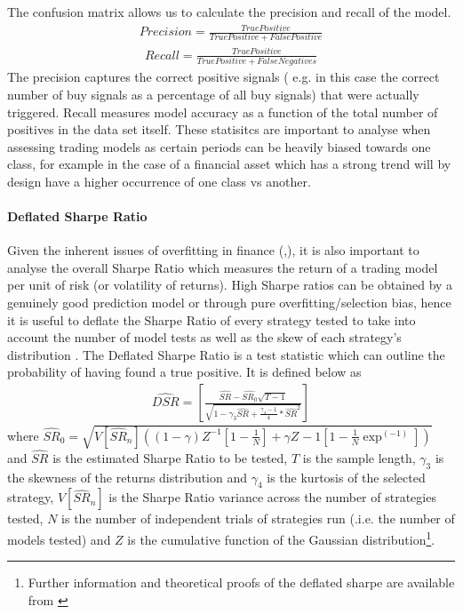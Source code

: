 \documentclass[11pt]{article}
\begin{document}
The confusion matrix allows us to calculate the precision and recall of the model.
\begin{align}
Precision = \frac{True Positive}{True Positive + False Positive} 
\end{align}
\begin{align}
Recall = \frac{True Positive}{True Positive + False Negatives} 
\end{align}
The precision captures the correct positive signals ( e.g. in this case the correct number of buy signals as a percentage of all buy signals) that were actually triggered. Recall measures model accuracy as a function of the total number of positives in the data set itself. These statisitcs are important to analyse when assessing trading models as certain periods can be heavily biased towards one class, for example in the case of a financial asset which has a strong trend will by design have a higher occurrence of one class vs another.

\paragraph{Deflated Sharpe Ratio}
Given the inherent issues of overfitting in finance (\cite{Arnott2018},\cite{LopezdePrado2018}), it is also important to analyse the overall Sharpe Ratio \cite{Sharpe2009} which measures the return of a trading model per unit of risk (or volatility of returns). \newline High Sharpe ratios can be obtained by a genuinely good prediction model or through pure overfitting/selection bias, hence it is useful to deflate the Sharpe Ratio of every strategy tested to take into account the number of model tests as well as the skew of each strategy's distribution \cite{Bailey2014}. 
The Deflated Sharpe Ratio is a test statistic which can outline the probability of having found a true positive. It is defined below as
\begin{align}
\widehat{DSR} = \left[
		 				\frac{\widehat{SR}-\widehat{SR_{0}}\sqrt{T-1}}
						{\sqrt{1-\gamma_{3}\widehat{SR} + \frac{\gamma_{4} - 1}{4}*\widehat{SR}^{2}}} 
				 \right]
\end{align}
where $\widehat{SR}_{0} = \sqrt{V\left[\widehat{SR}_{n}\right] 
						\left(      	
							\left(1- \gamma\right) Z^{-1} \left[ 1- \frac{1}{N}\right] + \gamma Z^{}-1 \left[ 1-\frac{1}{N}\exp^(-1) \right] 
						 \right)}$
and $\widehat{SR}$ is the estimated Sharpe Ratio to be tested, $T$ is the sample length, $\gamma_{3}$ is the skewness of the returns distribution and $\gamma_{4}$ is the kurtosis of the selected strategy,  $V\left[\widehat{SR}_{n}\right]$ is the Sharpe Ratio variance across the number of strategies tested, $N$ is the number of independent trials of strategies run (.i.e. the number of models tested) and $Z$ is the cumulative function of the Gaussian distribution\footnote{Further information and theoretical proofs of the deflated sharpe are available from \cite{Bailey2014}}.  
\end{document}
